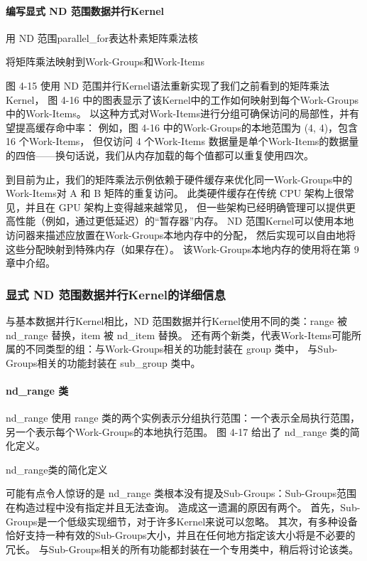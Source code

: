 \paragraph{编写显式 ND 范围数据并行Kernel}

{\color{red} 用 ND 范围parallel\_for表达朴素矩阵乘法核 }

{\color{red} 将矩阵乘法映射到Work-Groups和Work-Items}

图 4-15 使用 ND 范围并行Kernel语法重新实现了我们之前看到的矩阵乘法Kernel，
图 4-16 中的图表显示了该Kernel中的工作如何映射到每个Work-Groups中的Work-Items。 
以这种方式对Work-Items进行分组可确保访问的局部性，并有望提高缓存命中率：
例如，图 4-16 中的Work-Groups的本地范围为 (4, 4)，包含 16 个Work-Items，
但仅访问 4 个Work-Items 数据量是单个Work-Items的数据量的四倍——换句话说，我们从内存加载的每个值都可以重复使用四次。

到目前为止，我们的矩阵乘法示例依赖于硬件缓存来优化同一Work-Groups中的Work-Items对 A 和 B 矩阵的重复访问。 
此类硬件缓存在传统 CPU 架构上很常见，并且在 GPU 架构上变得越来越常见，
但一些架构已经明确管理可以提供更高性能（例如，通过更低延迟）的“暂存器”内存。 
ND 范围Kernel可以使用本地访问器来描述应放置在Work-Groups本地内存中的分配，
然后实现可以自由地将这些分配映射到特殊内存（如果存在）。 该Work-Groups本地内存的使用将在第 9 章中介绍。

\subsubsection{显式 ND 范围数据并行Kernel的详细信息}
与基本数据并行Kernel相比，ND 范围数据并行Kernel使用不同的类：range 被 nd\_range 替换，item 被 nd\_item 替换。 
还有两个新类，代表Work-Items可能所属的不同类型的组：与Work-Groups相关的功能封装在 group 类中，
与Sub-Groups相关的功能封装在 sub\_group 类中。

\paragraph{nd\_range 类}

nd\_range 使用 range 类的两个实例表示分组执行范围：一个表示全局执行范围，另一个表示每个Work-Groups的本地执行范围。 
图 4-17 给出了 nd\_range 类的简化定义。

{\color{red} nd\_range类的简化定义}

可能有点令人惊讶的是 nd\_range 类根本没有提及Sub-Groups：Sub-Groups范围在构造过程中没有指定并且无法查询。 
造成这一遗漏的原因有两个。 首先，Sub-Groups是一个低级实现细节，对于许多Kernel来说可以忽略。 
其次，有多种设备恰好支持一种有效的Sub-Groups大小，并且在任何地方指定该大小将是不必要的冗长。 
与Sub-Groups相关的所有功能都封装在一个专用类中，稍后将讨论该类。

